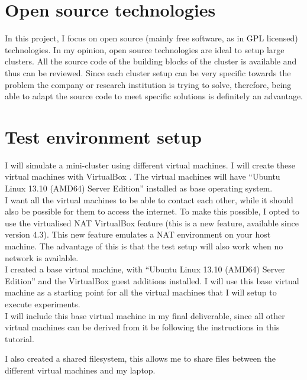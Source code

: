 \documentclass[12pt]{report}
\begin{document}
\section{Open source technologies}
In this project, I focus on open source (mainly free software, as in
GPL licensed) technologies. In my opinion,
open source technologies are ideal to setup large clusters. 
All the source code of the building blocks of the cluster is available
and thus can be reviewed. Since each cluster setup can be very
specific towards the problem the company or research institution is
trying to solve, therefore, being able to adapt the source code to
meet specific solutions is definitely an advantage.

\section{Test environment setup}
I will simulate a mini-cluster using different virtual machines. I
will create these virtual machines with VirtualBox
\cite{virtualbox_soft:2013}.  The virtual machines will have
``Ubuntu Linux 13.10 (AMD64) Server Edition''
\cite{ubuntu_server_13_10:2013} installed as base operating system.\\

I want all the virtual machines to be able to contact each other,
while it should also be possible for them to access
the internet.
To make this possible, I opted to use the virtualised NAT
VirtualBox feature (this is a new feature, available since version
4.3).
This new feature emulates a NAT environment on your host machine.
The advantage of this is that the test setup will also work when no
network is available.\\

I created a base virtual machine, with ``Ubuntu Linux 13.10 (AMD64)
Server Edition''  and the VirtualBox guest additions
installed. I will use this base virtual machine as a starting point
for all the virtual machines that I will setup to execute
experiments.\\
I will include this base virtual machine in my final deliverable,
since all other virtual machines can be derived from it be following
the instructions in this tutorial.

I also created a shared filesystem, this allows me to share files between the
different virtual machines and my laptop.
\end{document}
